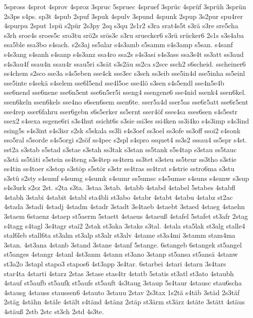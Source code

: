 {5spross
4sprot
4sprov
4sproz
3spruc
5spruec
4spruef
3sprüc
4sprüf
3sprüh
3sprün
2s3ps
s4ps.
sp3t
4spub
2spuf
3spuk
4spulv
3spund
4spunk
2spup
3s2pur
spu4rer
4spurpu
2sput
1spü
s2pür
2s3py
2sq
s3qu
2s1r2
s3ra
srat4s5t
s3rä
s3re
sre5cha
s3rh
sroe4s
sroes5c
sro3tu
srö2s
srös3c
s3ru
sruecker6
s3rü
srücker6
2s1s
s3s4aba
ssa5ble
ssa3bo
s4sach.
s2s3aj
ss5alar
s4s3amb
s5samm
s4s3amp
s5san.
s4sanf
s4s3ang
s4sanh
s4sanp
s4s3anz
ssa4ro
ssa2s
s4s3asi
s4s3ass
ssa3s4t
ss3att
ss3aud
s4s3au4f
ssau4n
ssau4r
ssau5ri
s3sät
s3s2äu
ss2ca
s2sce
ssch2
s6scheid.
sscheiner6
ss4chem
s2sco
sse3a
s4s5eben
sse4ck
sse3ec
s3seh
ss3eib
sse5in4d
sse5inha
ss5einl
sse5inte
s4sekä
s4selem
sse6l5end
sse4l5oe
sse4lö
s3sen
s4s5endl
sse4n5e4b
sse6nend
sse6nene
sse6n5ent
sse6n5er5i
sseng4
ssengene6
sse4nid
ssenk4
ssen6kel.
ssen6keln
ssen6kels
sse4no
s6sen6sem
ssen6te.
sser5a4d
sser5as
sse6r5att
sse6r5ent
sse4rep
sser6fahru
sser6gebn
s6s5erker
ss5ernt
sser4öf
sses4sa
sses6sen
s4s5estr
ssex2
s4sexa
ssgene6ri
s3s4hut
ssicht6s
s3sie
ssi3es
ssi4ken
ss3i4ko
s4s3imp
s4s3ind
ssing5s
s4s3int
s4s3isr
s2sk
s5skala
ss3li
s4s3oef
ss3oel
ss3ofe
ss3off
ssoi2
s4sonk
sso5ral
s5sorde
s4s5orgi
s2söf
ss4pec
s2spl
s4spro
ssquet4
ss3s2
sssau4
ss5spr
s4st.
sst2a
s3stab
s5stad
s3stae
s3stah
ss3tak
s3stan
ss5tank
s5s4tap
s3stau
ss5tauc
s3stä
ss5täti
s5stein
ss4teng
s3s4tep
ss4tern
ss3tet
s3steu
ss5teur
ss3tho
s3stie
ss4tin
ss4toer
s3stop
s3stöp
s5stör
s3str
ss4tras
ss4trat
s4strie
sstro6ma
s3stu
s3stü
s2sty
s4sumf
s4sumg
s4sumk
s4sumr
ss5umsc
s4s5umse
s4suns
s4sunw
s3sup
s4s3urk
s2sz
2st.
s2ta
s3ta.
3staa
3stab.
4stabb
4stabd
4stabel
5stabes
4stabfl
4stabh
3stabi
4stabit
4stabl
sta4bli
st3abo
4stabr
4stabt
4stabu
4stabz
st2ac
4stada
3stadi
4stadj
4stadm
4stadr
3stadt
3s4taeb
4staebt
3staed
4staeg
4staehn
3staem
6staenz
4staep
st5aerm
5staett
4staeus
4staeuß
4stafel
5stafet
st3afr
2stag
s4tagg
s4tagl
3s4tagr
stai2
2stak
st3aka
3staks
s3tal.
4stala
sta5lak
st3alg
stalle4
stal6leb
stall6ta
st3alm
st3alp
st3alr
st3alv
4stame
st3a4mi
3stamm
stam4ma
3stan.
4st3ana
4stanb
3stand
3stane
4stanf
5stange.
6stangeb
6stangek
st5angel
st5anges
4stangr
4stanl
4st3anm
4stann
st3ano
3stanp
st5ansa
st5ansä
4stanw
st3a2o
3stapl
stapo3
stapos6
4st3app
3s4tar.
6starbei
4stari
4starn
3s4tars
star4ta
4starti
4starz
2stas
3stase
stas4tr
4statb
5statis
st3atl
st3ato
4staubh
4stauf
st5aufb
st5aufk
st5aufs
st5auft
4s3taug
3staup
5s4taur
4stausc
stau6scha
4stausg
4stauss
staussen6
4stauto
3stauu
2stav
2s3tax
1s2tä
s4täb
3städ
2s3täf
2stäg
4stähn
4stäle
4stält
s4tänd
4stänz
2stäp
st3ärm
st3ärz
4stäte
3stätt
4stäus
4stäuß
2stb
2stc
st3ch
2std
4s3te.
}
